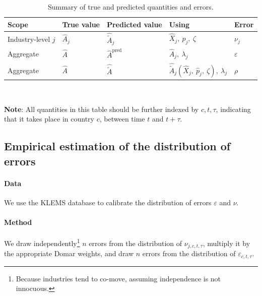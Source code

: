 \documentclass[11pt]{article}
\begin{document}
\begin{table}[h]
\caption{Summary of true and predicted quantities and errors. }
\centering
\begin{tabular}{@{}lllll@{}}
\toprule
Scope          & True value & Predicted value & Using & Error \\ \midrule
Industry-level $j$ &  $\hat{A}_j$    &    $\hat{\tilde{A}}_j$        &   $\hat{X}_j, ~\hat{p}_j,~\zeta$    & $\nu_j$      \\
Aggregate      &  $\hat{A}$    &    $\hat{A}^\text{pred}$        & $\hat{A}_j, ~\lambda_j$      &   $\varepsilon$    \\
Aggregate      &  $\hat{A}$    &    $\hat{\tilde{A}}$        &  $\hat{\tilde{A}}_j(\hat{X}_j, ~\hat{p}_j,~\zeta), ~\lambda_j$      & $\rho$       \\ \bottomrule
\end{tabular}
{\\\raggedright \footnotesize\textbf{Note}: All quantities in this table should be further indexed by  $c,t,\tau$, indicating that it takes place in country $c$, between time $t$ and $t+\tau$.\\}
\end{table}

\subsection{Empirical estimation of the distribution of errors}

\paragraph{Data} We use the KLEMS database to calibrate the distribution of errors $\varepsilon$ and $\nu$. 

\paragraph{Method} We draw independently\footnote{
%
Because industries tend to co-move, assuming independence is not innocuous. 
%
} $n$ errors from the distribution of $\nu_{j,c,t,\tau}$, multiply it by the appropriate Domar weights, and draw $n$ errors from the distribution of $\varepsilon_{c,t,\tau}$.
\end{document}
